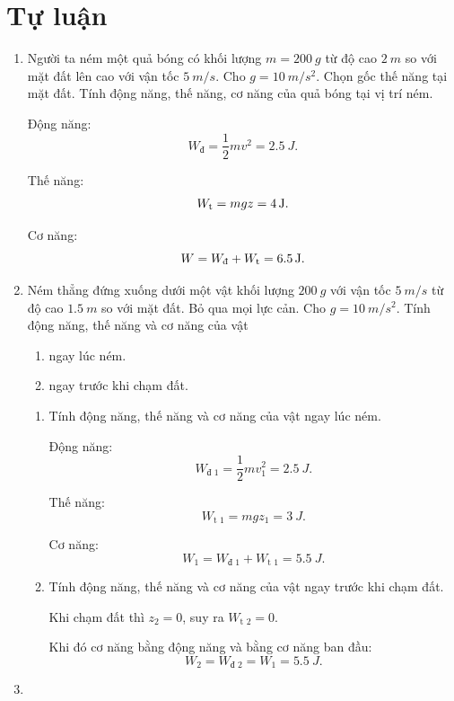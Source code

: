 \section{Tự luận}
\begin{enumerate}[label=\bfseries Câu \arabic*:, leftmargin=1.5cm]
		\item {}
	
	
	{
		Người ta ném một quả bóng có khối lượng $m=\SI{200}{g}$ từ độ cao $\SI{2}{m}$ so với mặt đất lên cao với vận tốc $\SI{5}{m/s}$. Cho $g=\SI{10}{m/s^2}$. Chọn gốc thế năng tại mặt đất. Tính động năng, thế năng, cơ năng của quả bóng tại vị trí ném.
	}
	
	\hideall
	{	
		Động năng:
		$$W_\text{đ} = \dfrac{1}{2}mv^2 = \SI{2.5}{J}.$$
		
		Thế năng:
		$$W_\text t = mgz = \SI{4}{J}.$$
		
		Cơ năng:
		$$W=W_\text{đ} + W_\text t = \SI{6.5}{J}.$$
	}
	\item {}
	
	
	{
		Ném thẳng đứng xuống dưới một vật khối lượng $\SI{200}{g}$ với vận tốc $\SI{5}{m/s}$ từ độ cao $\SI{1.5}{m}$ so với mặt đất. Bỏ qua mọi lực cản. Cho $g=\SI{10}{m/s^2}$. Tính động năng, thế năng và cơ năng của vật
		\begin{enumerate}[label=\alph*)]
			\item ngay lúc ném.
			\item ngay trước khi chạm đất.
		\end{enumerate}
	}
	
	\hideall
	{	
		\begin{enumerate}[label=\alph*)]
			\item Tính động năng, thế năng và cơ năng của vật ngay lúc ném.
			
			Động năng:
			$$W_\text{đ 1} = \dfrac{1}{2}mv_1^2 = \SI{2.5}{J}.$$
			
			Thế năng:
			$$W_\text{t 1} = mgz_1 = \SI{3}{J}.$$
			
			Cơ năng:
			$$W_1 = W_\text{đ 1} + W_\text{t 1} = \SI{5.5}{J}.$$
			\item Tính động năng, thế năng và cơ năng của vật ngay trước khi chạm đất.
			
			Khi chạm đất thì $z_2 = 0$, suy ra $W_\text{t 2} = 0$.
			
			Khi đó cơ năng bằng động năng và bằng cơ năng ban đầu:
			$$W_2 = W_\text{đ 2} = W_1 = \SI{5.5}{J}.$$
		\end{enumerate}
	}
	\item {}
	

\end{enumerate}
